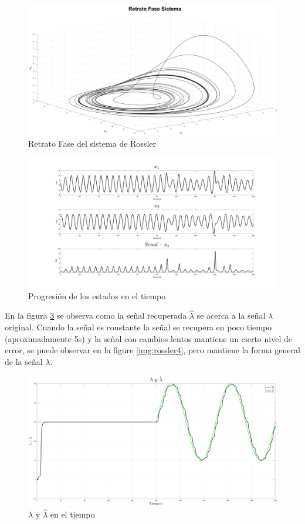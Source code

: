 \begin{figure}[H]
	\centering
	\includegraphics[width=150mm]{img/E2_RetratoFase.png}
	\caption{Retrato Fase del sistema de Rossler}
	\label{img:rossler1}
\end{figure}

\begin{figure}[H]
	\centering
	\includegraphics[width=150mm]{img/E2_Estados.png}
	\caption{Progresión de los estados en el tiempo}
	\label{img:rossler2}
\end{figure}

En la figura \ref{img:rossler3} se observa como la señal recuperada $\hat{\lambda}$ se acerca a la señal $\lambda$ original. Cuando la señal es constante la señal se recupera en poco tiempo (aproximadamente 5s) y la señal con cambios lentos mantiene un cierto nivel de error, se puede observar en la figure \ref{img:rossler4}, pero mantiene la forma general de la señal $\lambda$.

\begin{figure}[H]
	\centering
	\includegraphics[width=150mm]{img/E2_Lambda.png}
	\caption{$\lambda$ y $\hat{\lambda}$ en el tiempo}
	\label{img:rossler3}
\end{figure}

